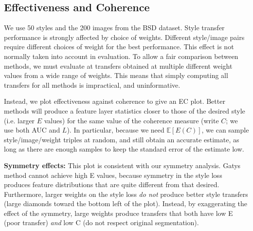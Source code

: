 \documentclass[runningheads]{llncs}
\newcommand{\expect}[1]{{\mathbb{E}}{{\left[{{#1}}\right]}}}
\begin{document}
\subsection{Effectiveness and Coherence}\label{ecplot}

We use 50 styles and the 200 images from the BSD dataset.  Style transfer performance is strongly affected by choice of
weights.  Different style/image pairs require different choices of weight for the best performance.  This effect is not
normally taken into account in evaluation.  To allow a fair comparison between methods, we must evaluate at 
transfers obtained at multiple different weight values from a wide range of weights.  This means that simply computing
all transfers for all methods is impractical, and uninformative. 

Instead, we plot effectiveness against coherence to give an EC plot. Better methods will produce a feature layer
statistics closer to those of the desired style (i.e. larger $E$ values) for the same value of the coherence measure
(write $C$; we use both AUC and $L$).  In particular, because we need $\expect{E(C)}$, we can sample style/image/weight
triples at random, and still obtain an accurate estimate, as long as there are enough samples to keep the standard error
of the estimate low. 

{\bf Symmetry effects:} This plot is consistent with our symmetry analysis.  Gatys method cannot achieve high E values,
because symmetry in the style loss produces feature distributions that are quite different from that desired.
Furthermore, larger weights on the style loss {\em do not} produce better style transfers (large diamonds toward the
  bottom left of the plot).  Instead, by exaggerating the effect of the symmetry, large weights produce transfers that
  both have low E (poor transfer) {\em and} low C (do not respect original segmentation).  
\end{document}
